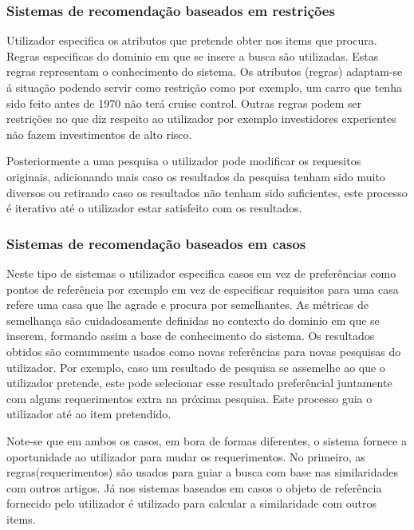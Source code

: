 \subsubsection{Sistemas de recomendação baseados em restrições}
\hfill
 \par Utilizador especifica os atributos que pretende obter nos items que procura. Regras especificas do dominio em que se insere a busca são utilizadas. Estas regras representam o conhecimento do sistema. Os atributos (regras) adaptam-se á situação podendo servir como restrição como por exemplo, um carro que tenha sido feito  antes de 1970 não terá cruise control. Outras regras podem ser restrições no que diz respeito ao utilizador por exemplo investidores experientes não fazem investimentos de alto risco. 
 \par Posteriormente a uma pesquisa o utilizador pode modificar os requesitos originais, adicionando mais caso os resultados da pesquisa tenham sido muito diversos ou retirando caso os resultados não tenham sido suficientes, este processo é iterativo até o utilizador estar satisfeito com os resultados.  

\hfill
\subsubsection{Sistemas de recomendação baseados em casos}
\hfill
\par Neste tipo de sistemas o utilizador especifica casos  em vez de preferências como pontos de referência por exemplo em vez de especificar requisitos para uma casa refere uma casa que lhe agrade e procura por semelhantes. As métricas de semelhança são cuidadosamente definidas no contexto do dominio em que se inserem, formando assim a base de conhecimento do sistema. Os resultados obtidos são comummente usados como novas referências para novas pesquisas do utilizador.  Por exemplo, caso um resultado de pesquisa se assemelhe ao que o utilizador pretende, este pode selecionar esse resultado preferêncial juntamente com alguns requerimentos extra na próxima pesquisa. Este processo guia o utilizador até ao item pretendido.
\par Note-se que em ambos os casos, em bora de formas diferentes, o sistema fornece a oportunidade ao utilizador para mudar os requerimentos.
No primeiro, as regras(requerimentos) são usados para guiar a busca com base nas similaridades com outros artigos. Já nos sistemas baseados em casos o objeto de referência fornecido pelo utilizador é utilizado para calcular a similaridade com outros items.
 



